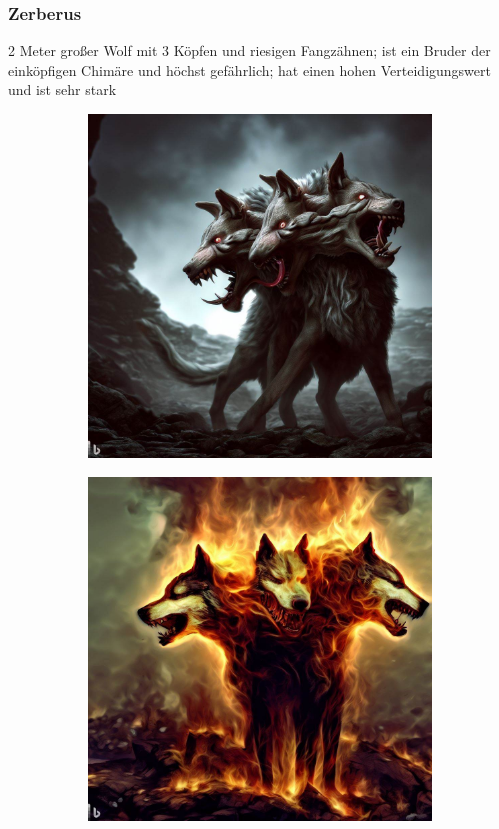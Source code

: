 \documentclass[11pt, twoside]{article}
\begin{document}
\subsubsection{Zerberus\label{zerberus}}
\label{sec:orga8af7d3}
2 Meter großer Wolf mit 3 Köpfen und riesigen Fangzähnen; ist ein Bruder der einköpfigen Chimäre und höchst gefährlich; hat einen hohen Verteidigungswert und ist sehr stark
\begin{figure}[H]
\centering
\caption{Zerberus}
\label{fig:dogo}
  \begin{subfigure}{0.3\textwidth}
    \centering
    \includegraphics[width=0.99\linewidth]{dogo1.jpeg}
  \end{subfigure}%
  \begin{subfigure}{0.3\textwidth}
    \centering
    \includegraphics[width=0.99\linewidth]{dogo2.jpeg}

\end{subfigure}
\end{figure}
\end{document}
